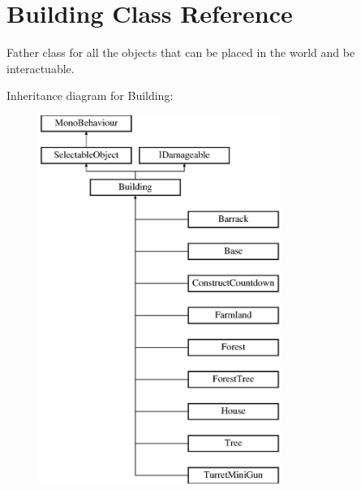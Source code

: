 \hypertarget{class_building}{}\section{Building Class Reference}
\label{class_building}


Father class for all the objects that can be placed in the world and be interactuable.  


Inheritance diagram for Building\+:\begin{figure}[H]
\begin{center}
\leavevmode
\includegraphics[height=12.000000cm]{class_building}
\end{center}
\end{figure}
